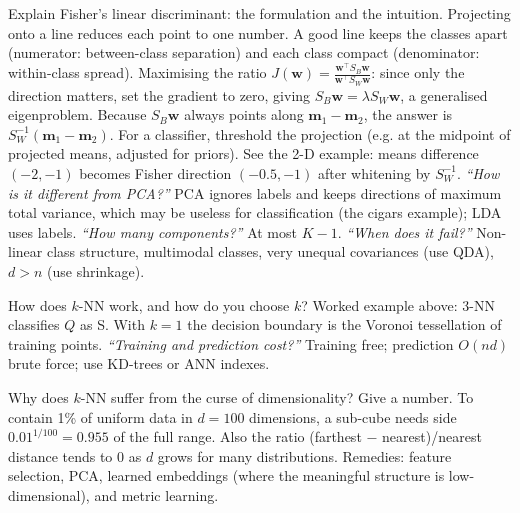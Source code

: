 \begin{qa}{ Explain Fisher's linear discriminant: the formulation and the intuition.}
\why
Projecting onto a line reduces each point to one number. A good line keeps the classes apart (numerator: between-class separation) and
each class compact (denominator: within-class spread). Maximising the ratio $J(\mathbf w) = \frac{\mathbf w^\top S_B\mathbf w}{\mathbf w^\top
S_W\mathbf w}$: since only the direction matters, set the gradient to zero, giving $S_B\mathbf w = \lambda S_W\mathbf w$, a generalised
eigenproblem. Because $S_B\mathbf w$ always points along $\mathbf m_1 - \mathbf m_2$, the answer is $S_W^{-1}(\mathbf m_1 - \mathbf m_2)$. For a
classifier, threshold the projection (e.g. at the midpoint of projected means, adjusted for priors).
\worked See the 2-D example: means difference $(-2,-1)$ becomes Fisher direction $(-0.5,-1)$ after whitening by $S_W^{-1}$.
\pushes \emph{``How is it different from PCA?''} PCA ignores labels and keeps directions of maximum total variance, which may be useless
for classification (the cigars example); LDA uses labels. \emph{``How many components?''} At most $K-1$. \emph{``When does it
fail?''} Non-linear class structure, multimodal classes, very unequal covariances (use QDA), $d > n$ (use shrinkage).
\end{qa}

\begin{qa}{How does $k$-NN work, and how do you choose $k$?}
\why Worked example above: 3-NN classifies $Q$ as S. With $k=1$ the decision boundary is the Voronoi tessellation of training points.
\pushes \emph{``Training and prediction cost?''} Training free; prediction $O(nd)$ brute force; use KD-trees or ANN indexes.
\end{qa}

\begin{qa}{\deep Why does $k$-NN suffer from the curse of dimensionality? Give a number.}
\why To contain 1\% of uniform data in $d = 100$ dimensions, a sub-cube needs side $0.01^{1/100} = 0.955$ of the full range. Also the ratio
(farthest $-$ nearest)/nearest distance tends to 0 as $d$ grows for many distributions. Remedies: feature selection, PCA, learned
embeddings (where the meaningful structure is low-dimensional), and metric learning.
\end{qa}


